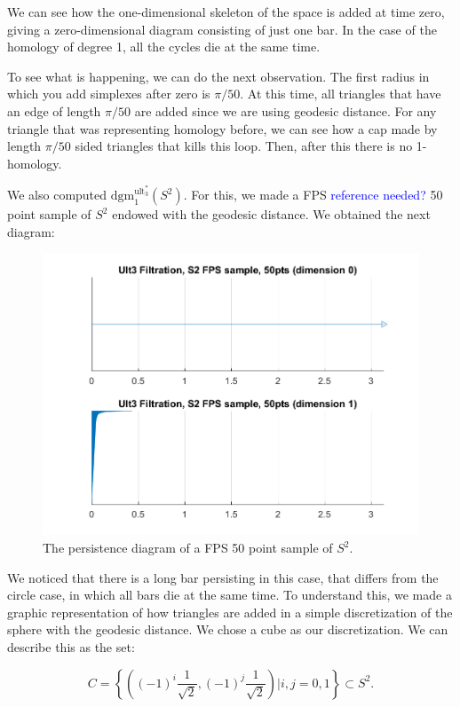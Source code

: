 \documentclass[a4paper,12pt,reqno, english]{amsart}
\newcommand{\dgm}{\mathrm{dgm}}
\DeclareMathOperator{\ult}{ult}
\theoremstyle{plain}
\theoremstyle{definition}
\newcommand{\jose}[1]{\textcolor{blue}{#1} }
\begin{document}
{{We can see how the one-dimensional skeleton of the space is added at time zero, giving a zero-dimensional diagram consisting of just one bar. In the case of the homology of degree 1, all the cycles die at the same time. 

To see what is happening, we can do the next observation. The first radius in which you add simplexes after zero is $\pi/50$. At this time, all triangles that have an edge of length $\pi/50$ are added since we are using geodesic distance. For any triangle that was representing homology before, we can see how a cap made by length $\pi/50$ sided triangles that kills this loop. Then, after this there is no 1-homology.

We also computed $\dgm^{\ult^*_3}_1(S^2).$ For this, we made a FPS \jose{reference needed?} 50 point sample of $S^2$ endowed with the geodesic distance. We obtained the next diagram:

\begin{figure}
	\includegraphics[scale=0.8]{Ult3FiltrationS2FPSsample50pts.png}
    \caption{The persistence diagram of a FPS 50 point sample of $S^2$. }
\end{figure}

We noticed that there is a long bar persisting in this case, that differs from the circle case, in which all bars die at the same time. To understand this, we made a graphic representation of how triangles are added in a simple discretization of the sphere with the geodesic distance. We chose a cube as our discretization. We can describe this as the set:

$$ C= \left\{ \left((-1)^i\frac{1}{\sqrt{2}},(-1)^j\frac{1}{\sqrt{2}}\right) \bigg| i,j=0,1 \right\}\subset S^2 . $$

}}
\end{document}
